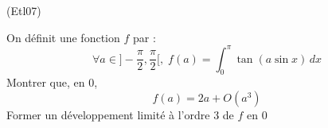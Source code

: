 \begin{tiny}(Etl07)\end{tiny} On définit une fonction $f$ par :
\begin{displaymath}
 \forall a\in ]-\frac{\pi}{2},\frac{\pi}{2}[,\;
f(a)=\int_0^\pi\tan(a\sin x)\, dx
\end{displaymath}
Montrer que, en $0$,
\begin{displaymath}
 f(a) = 2a + O(a^3)
\end{displaymath}
Former un développement limité à l'ordre $3$ de $f$ en $0$